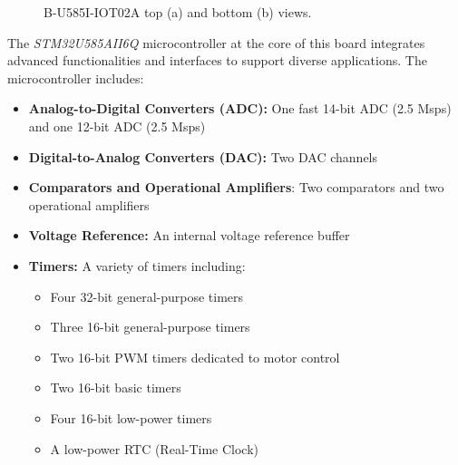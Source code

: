 \documentclass[10pt,a4paper,onecolumn]{article}
\begin{document}
\begin{figure}[H]
  \begin{center}
    \hfill
    \caption{B-U585I-IOT02A top (a) and bottom (b) views.}
  \end{center}
\end{figure}

The \textit{STM32U585AII6Q} microcontroller at the core of this board integrates advanced functionalities and interfaces to support diverse applications. The microcontroller includes:

\begin{itemize}
  \item \textbf{Analog-to-Digital Converters (ADC):} One fast 14-bit ADC (2.5 Msps) and one 12-bit ADC (2.5 Msps)
  \item \textbf{Digital-to-Analog Converters (DAC):} Two DAC channels
  \item \textbf{Comparators and Operational Amplifiers}: Two comparators and two operational amplifiers
  \item \textbf{Voltage Reference:} An internal voltage reference buffer
  \item \textbf{Timers:} A variety of timers including:
  \begin{itemize}
    \item Four 32-bit general-purpose timers
    \item Three 16-bit general-purpose timers
    \item Two 16-bit PWM timers dedicated to motor control
    \item Two 16-bit basic timers
    \item Four 16-bit low-power timers
    \item A low-power RTC (Real-Time Clock)
  \end{itemize}
\end{itemize}
\end{document}

